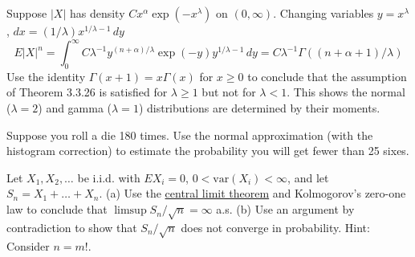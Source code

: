   \begin{exercise}[Durrett 3.3.25]
    Suppose $|X|$ has density $Cx^\alpha \exp(-x^\lambda)$ on $(0, \infty)$. Changing variables $y = x^\lambda$, $dx = (1/\lambda)x^{1/\lambda-1} \, dy$
    \begin{equation*}
      E|X|^n = \int_0^\infty C\lambda^{-1} y^{(n+\alpha)/\lambda} \exp(-y) y^{1/\lambda-1} \, dy = C\lambda^{-1} \Gamma((n + \alpha + 1)/\lambda)
    \end{equation*}
    Use the identity $\Gamma(x + 1) = x\Gamma(x)$ for $x \geq 0$ to conclude that the assumption of Theorem 3.3.26 is satisfied for $\lambda \geq 1$ but not for $\lambda < 1$. This shows the normal ($\lambda = 2$) and gamma ($\lambda = 1$) distributions are determined by their moments.
  \end{exercise}
  \begin{solution}

  \end{solution}

  \begin{exercise}[Durrett 3.4.1]
    Suppose you roll a die 180 times. Use the normal approximation (with the histogram correction) to estimate the probability you will get fewer than 25 sixes.
  \end{exercise}
  \begin{solution}

  \end{solution}

  \begin{exercise}[Durrett 3.4.2]
    Let $X_1, X_2, \dots$ be i.i.d. with $EX_i = 0$, $0 < \text{var}(X_i) < \infty$, and let $S_n = X_1 + \dots + X_n$. (a) Use the \hyperref[thm:central-limit-theorem]{central limit theorem} and Kolmogorov's zero-one law to conclude that $\limsup S_n/\sqrt{n} = \infty$ a.s. (b) Use an argument by contradiction to show that $S_n/\sqrt{n}$ does not converge in probability. Hint: Consider $n = m!$.
  \end{exercise}
  \begin{solution}

  \end{solution}

